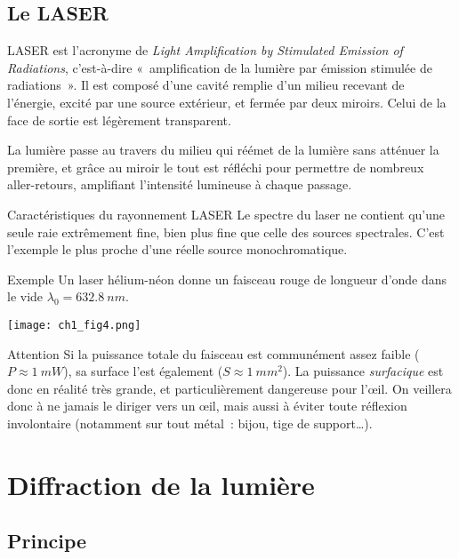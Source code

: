 \documentclass[../main/main.tex]{subfiles}
\begin{document}
\subsection{Le LASER}
LASER est l'acronyme de \textit{Light Amplification by Stimulated Emission of
Radiations}, c'est-à-dire «~amplification de la lumière par émission stimulée de
radiations~». Il est composé d'une cavité remplie d'un milieu recevant de
l'énergie, excité par une source extérieur, et fermée par deux miroirs. Celui de
la face de sortie est légèrement transparent.

La lumière passe au travers du milieu qui réémet de la lumière sans atténuer la
première, et grâce au miroir le tout est réfléchi pour permettre de nombreux
aller-retours, amplifiant l'intensité lumineuse à chaque passage.

\begin{NCdefi}[]{Caractéristiques du rayonnement LASER}
    Le spectre du laser ne contient qu'une seule raie extrêmement fine, bien
    plus fine que celle des sources spectrales. C'est l'exemple le plus proche
    d'une réelle source monochromatique.
\end{NCdefi}
\begin{NCexem}[sidebyside]{Exemple}
    Un laser hélium-néon donne un faisceau rouge de longueur d'onde dans le vide
    $\lambda_0 = \SI{632.8}{nm}$.
    \tcblower
    \begin{center}
        \texttt{[image: ch1\_fig4.png]}
        \label{fig:laser_spec}
    \end{center}
\end{NCexem}
\begin{NCimpo}[hand]{Attention}
    Si la puissance totale du faisceau est communément assez faible ($P \approx
    \SI{1}{mW}$), sa surface l'est également ($S \approx \SI{1}{mm^2}$). La
    puissance \textit{surfacique} est donc en réalité très grande, et
    particulièrement dangereuse pour l'œil. On veillera donc à ne jamais le
    diriger vers un œil, mais aussi à éviter toute réflexion involontaire
    (notamment sur tout métal~: bijou, tige de support…).
\end{NCimpo}

\section{Diffraction de la lumière}

\subsection{Principe}
\end{document}
